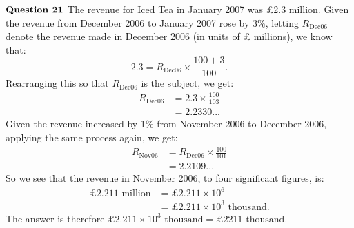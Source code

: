 \documentclass{article}
\begin{document}
$\textbf{Question 21} \\$
The revenue for Iced Tea in January 2007 was £2.3 million. Given the revenue from December 2006 to January 2007 rose by 3$\%$, letting $R_{\text{Dec06}}$ denote the revenue made in December 2006 (in units of £ millions), we know that:
$$2.3 = R_{\text{Dec06}} \times \frac{100 + 3}{100}.$$
Rearranging this so that $R_{\text{Dec06}}$ is the subject, we get:
\begin{align*}
R_{\text{Dec06}} &= 2.3 \times \frac{100}{103}\\
&= 2.2330...
\end{align*}
Given the revenue increased by 1$\%$ from November 2006 to December 2006, applying the same process again, we get:
\begin{align*}
R_{\text{Nov06}} &= R_{\text{Dec06}} \times \frac{100}{101}\\
&= 2.2109...
\end{align*}
So we see that the revenue in November 2006, to four significant figures, is:
\begin{align*}
£2.211\text{ million} &= £2.211 \times 10^6 \\
&=£2.211 \times 10^3 \text{ thousand}.
\end{align*}
The answer is therefore $£2.211 \times 10^3 \text{ thousand} =£2211\text{ thousand}$. 
\end{document}
